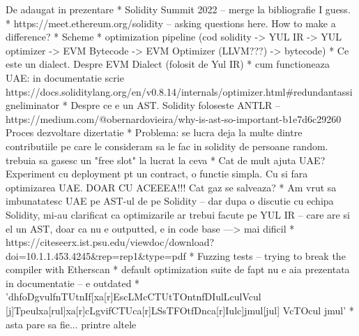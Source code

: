 De adaugat in prezentare
* Solidity Summit 2022 – merge la bibliografie I guess.
* https://meet.ethereum.org/solidity – asking questions here. How to make a difference?
* Scheme
  * optimization pipeline (cod solidity -> YUL IR -> YUL optimizer -> EVM Bytecode -> EVM Optimizer (LLVM???) -> bytecode)
* Ce este un dialect. Despre EVM Dialect (folosit de Yul IR)
* cum functioneaza UAE: in documentatie scrie https://docs.soliditylang.org/en/v0.8.14/internals/optimizer.html#redundantassigneliminator
* Despre ce e un AST. Solidity foloseste ANTLR – https://medium.com/@obernardovieira/why-is-ast-so-important-b1e7d6c29260
Proces dezvoltare dizertatie
* Problema: se lucra deja la multe dintre contributiile pe care le consideram sa le fac in solidity de persoane random. trebuia sa gasesc un "free slot" la lucrat la ceva
* Cat de mult ajuta UAE? Experiment cu deployment pt un contract, o functie simpla. Cu si fara optimizarea UAE. DOAR CU ACEEEA!!! Cat gaz se salveaza?
* Am vrut sa imbunatatesc UAE pe AST-ul de pe Solidity – dar dupa o discutie cu echipa Solidity, mi-au clarificat ca optimizarile ar trebui facute pe YUL IR – care are si el un AST, doar ca nu e outputted, e in code base ---> mai dificil
* https://citeseerx.ist.psu.edu/viewdoc/download?doi=10.1.1.453.4245&rep=rep1&type=pdf 
* Fuzzing tests – trying to break the compiler with Etherscan
* default optimization suite de fapt nu e aia prezentata in documentatie – e outdated
  * 'dhfoDgvulfnTUtnIf[xa[r]EscLMcCTUtTOntnfDIulLculVcul [j]Tpeulxa[rul]xa[r]cLgvifCTUca[r]LSsTFOtfDnca[r]Iulc]jmul[jul] VcTOcul jmul'
  * asta pare sa fie... printre altele

